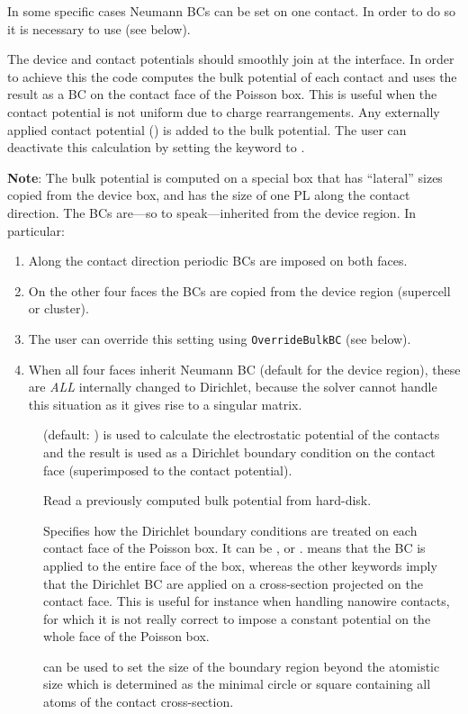 In some specific cases Neumann BCs can be set on one contact. In order to do so
it is necessary to use  (see below).

The device and contact potentials should smoothly join at the interface. In
order to achieve this the code computes the bulk potential of each contact and
uses the result as a BC on the contact face of the Poisson box. This is useful
when the contact potential is not uniform due to charge rearrangements. Any
externally applied contact potential () is added to the bulk
potential.  The user can deactivate this calculation by setting the keyword
 to .

{\bf Note}: The bulk potential is computed on a special box that has ``lateral''
sizes copied from the device box, and has the size of one PL along the contact
direction. The BCs are---so to speak---inherited from the device region. In
particular:
\begin{enumerate}
\item Along the contact direction periodic BCs are imposed on both faces.
\item On the other four faces the BCs are copied from the device region
  (supercell or cluster).
\item The user can override this setting using \verb|OverrideBulkBC| (see
  below).
\item When all four faces inherit Neumann BC (default for the device region),
  these are {\em ALL} internally changed to Dirichlet, because the solver cannot
  handle this situation as it gives rise to a singular matrix.
\end{enumerate}

\begin{description}
\item[] (default: ) is used to calculate the
  electrostatic potential of the contacts and the result is used as a Dirichlet
  boundary condition on the contact face (superimposed to the contact
  potential).
\item[] Read a previously computed bulk potential from
  hard-disk.
\item[] Specifies how the Dirichlet boundary conditions are
  treated on each contact face of the Poisson box. It can be ,
   or .  means that the BC is applied to the
  entire face of the box, whereas the other keywords imply that the Dirichlet BC
  are applied on a cross-section projected on the contact face. This is useful
  for instance when handling nanowire contacts, for which it is not really
  correct to impose a constant potential on the whole face of the Poisson box.
\item[] can be used to set the size of
  the boundary region beyond the atomistic size which is determined as the
  minimal circle or square containing all atoms of the contact cross-section.
\end{description}

